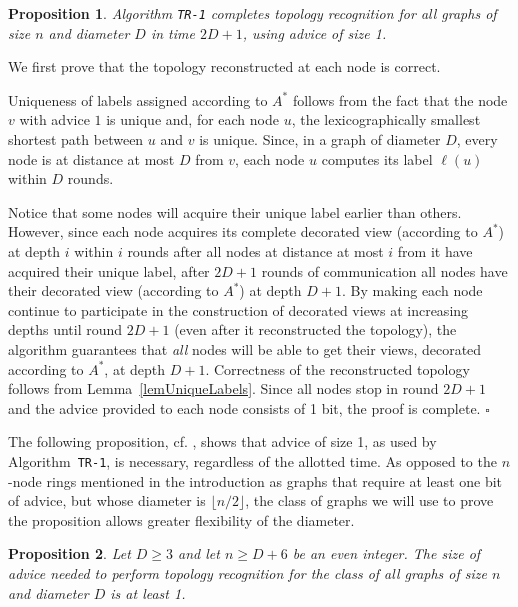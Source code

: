 \documentclass{article}
\newcommand*{\qed}{\hfill\ensuremath{\square}}
\newtheorem{proposition}{Proposition}[section]
\newenvironment{proof}{\noindent{\bf Proof:}}{\qed}
\begin{document}
\begin{proposition}\label{ubTime2D+1}
Algorithm {\tt TR-1} completes topology recognition for all graphs of size $n$ and diameter $D$ in time $2D+1$, using advice of size 1.
\end{proposition}
\begin{proof}
We first prove that the topology reconstructed at each node is correct.

Uniqueness of labels assigned according to  $A^*$  follows from the fact that  the node $v$ with advice $1$ is unique and, for each node $u$,
the lexicographically smallest shortest path between $u$ and $v$ is unique.
Since, in a graph of diameter $D$, every node is at distance at most $D$ from $v$, each node $u$ computes its label $\ell(u)$ within $D$ rounds.

Notice that some nodes will acquire their unique label earlier than others. However, since each node acquires its complete decorated view (according to $A^*$) at depth $i$ within $i$ rounds after all nodes at distance at most $i$ from it have acquired their unique label, after $2D+1$ rounds of communication all nodes have their decorated view (according to $A^*$) at depth $D+1$.
By making each node continue to participate in the construction of decorated views at increasing depths until round $2D+1$ (even after it reconstructed the topology), the algorithm guarantees that {\em all} nodes will be able to get their views, decorated according to $A^*$, at depth $D+1$. Correctness of the reconstructed topology follows from Lemma~\ref{lemUniqueLabels}. Since all nodes stop in round $2D+1$ and the advice provided to each node consists of 1 bit, the proof is complete.
\end{proof}

The following proposition, cf. \cite{YK3}, shows that advice of size 1, as used by Algorithm~{\tt TR-1}, is necessary, regardless of the allotted time.
As opposed to the $n$-node rings mentioned in the introduction as graphs that require at least one bit of advice, but whose diameter is $\lfloor n/2 \rfloor$, the class of graphs we will use to prove the proposition allows greater flexibility of the diameter.

\begin{proposition}\label{lb2D+1}
Let $D\ge 3$ and let $n\ge D+6$ be an even integer.
The size of advice needed to perform topology recognition for the class of all graphs of size $n$ and diameter $D$ is at least 1.
\end{proposition}
\end{document}
